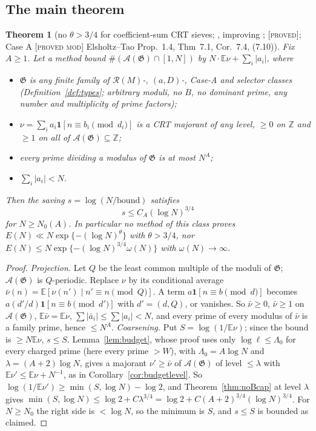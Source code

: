 \documentclass[10pt,reqno]{amsart}
\newtheorem{theorem}{Theorem}[section]
\theoremstyle{definition}
\theoremstyle{remark}
\newcommand{\A}{\mathcal A}
\newcommand{\cR}{\mathscr R}
\newcommand{\cG}{\mathfrak G}
\newcommand{\E}{\mathbb E}
\newcommand{\Z}{\mathbb Z}
\newcommand{\ind}{\mathbf 1}
\newcommand{\lab}[1]{\textup{[\textsc{#1}]}}
\begin{document}
\subsection{The main theorem}
\begin{theorem}[no $\theta>3/4$ for coefficient-sum CRT sieves; {\cite[Cor.~4.2]{KA3}}, improving {\cite[Cor.~6.1]{KA2}}; \lab{proved}; Case A \lab{proved mod} Elsholtz--Tao Prop.~1.4, Thm~7.1, Cor.~7.4, (7.10)]\label{thm:main}
Fix $A\geq1$.  Let a method bound $\#(\A(\cG)\cap[1,N])$ by
$N\cdot\E\nu+\sum_i|a_i|$, where
\begin{itemize}
\item $\cG$ is any finite family of $\cR(M)$-, $(a,D)$-, Case-A and selector
  classes (Definition~\ref{def:types}; arbitrary moduli, no $B$, no dominant
  prime, any number and multiplicity of prime factors);
\item $\nu=\sum_ia_i\ind[n\equiv b_i\pmod{d_i}]$ is a CRT majorant of any
  level, $\geq0$ on $\Z$ and $\geq1$ on all of $\A(\cG)\subseteq\Z$;
\item every prime dividing a modulus of $\cG$ is at most $N^A$;
\item $\sum_i|a_i|<N$.
\end{itemize}
Then the saving $s=\log(N/\text{bound})$ satisfies
\[
 s\leq C_A(\log N)^{3/4}
\]
for $N\geq N_0(A)$.  In particular no method of this class proves
$E(N)\ll N\exp\{-(\log N)^\theta\}$ with $\theta>3/4$, nor
$E(N)\leq N\exp\{-(\log N)^{3/4}\omega(N)\}$ with $\omega(N)\to\infty$.
\end{theorem}
\begin{proof}
\emph{Projection.}  Let $Q$ be the least common multiple of the moduli of
$\cG$; $\A(\cG)$ is $Q$-periodic.  Replace $\nu$ by its conditional
average $\bar\nu(n)=\E[\nu(n')\mid n'\equiv n\pmod Q]$.  A term
$a\ind[n\equiv b\pmod d]$ becomes $a(d'/d)\ind[n\equiv b\pmod{d'}]$ with
$d'=(d,Q)$, or vanishes.  So $\bar\nu\geq0$, $\bar\nu\geq1$ on $\A(\cG)$,
$\E\bar\nu=\E\nu$, $\sum|\bar a_i|\leq\sum|a_i|<N$, and every prime of every
modulus of $\bar\nu$ is a family prime, hence $\leq N^A$.
\emph{Coarsening.}  Put $S=\log(1/\E\nu)$; since the bound is $\geq N\E\nu$,
$s\leq S$.  Lemma~\ref{lem:budget}, whose proof uses only
$\log\ell\leq\Lambda_0$ for every charged prime (here every prime $>W$),
with $\Lambda_0=A\log N$ and $\lambda=(A+2)\log N$, gives a majorant
$\nu'\geq\bar\nu$ of $\A(\cG)$ of level $\leq\lambda$ with
$\E\nu'\leq\E\nu+N^{-1}$, as in Corollary~\ref{cor:budgetlevel}.  So
$\log(1/\E\nu')\geq\min(S,\log N)-\log2$, and Theorem~\ref{thm:noBcap}
at level $\lambda$ gives
$\min(S,\log N)\leq\log2+C\lambda^{3/4}=\log2+C(A+2)^{3/4}(\log N)^{3/4}$.  For $N\geq N_0$ the right side is $<\log N$,
so the minimum is $S$, and $s\leq S$ is bounded as claimed.
\end{proof}
\end{document}
